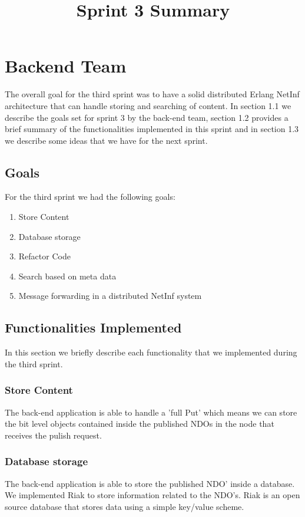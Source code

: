 \documentclass[a4paper,10pt]{article}
\title{Sprint 3 Summary}
\begin{document}
\maketitle

\section{Backend Team}

The overall goal for the third sprint was to have a solid distributed Erlang NetInf
architecture that can handle storing and searching of content. In section 1.1 we
describe the goals set for sprint 3 by the back-end team, section 1.2 provides a
brief summary of the functionalities implemented in this sprint and in section
1.3 we describe some ideas that we have for the next sprint.


\subsection {Goals}
\label{sect:goals}
For the third sprint we had the following goals:
\begin{enumerate}
 \item Store Content
 \item Database storage
 \item Refactor Code
 \item Search based on meta data
 \item Message forwarding in a distributed NetInf system
\end{enumerate}
\subsection {Functionalities Implemented}
In this section we briefly describe each functionality that we implemented during
the third sprint.
\subsubsection {Store Content}
The back-end application is able to handle a ’full Put’ which means we can
store the bit level objects contained inside the published NDOs in the node that
receives the pulish request.
\subsubsection {Database storage}
The back-end application is able to store the published NDO’ inside a database.
We implemented Riak to store information related to the NDO’s. Riak is an
open source database that stores data using a simple key/value scheme.
\end{document}
